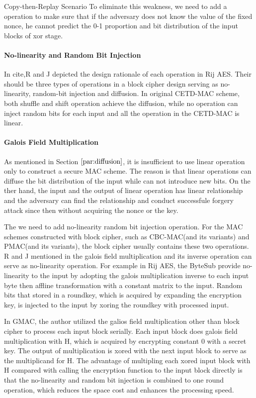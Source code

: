 Copy-then-Replay Scenario
To eliminate this weakness, we need to add a operation to make sure that if the adversary does not know the value of the fixed nonce, he cannot predict the 0-1 proportion and bit distribution of the input blocks of xor stage. 
\paragraph{No-linearity and Random Bit Injection}
In cite{},R and J depicted the design rationale of each operation in Rij AES. Their should be three types of operations in a block cipher design serving as no-linearity, random-bit injection and diffusion.  
In original CETD-MAC scheme, both shuffle and shift operation achieve the diffusion, while no operation can inject random bits for each input and all the operation in the CETD-MAC is linear.  

\paragraph{Galois Field Multiplication}
As mentioned in Section $\ref{par:diffusion}$, it is insufficient to use linear operation
only to construct a secure MAC scheme. The reason is that linear operations can
diffuse the bit distribution of the input while can not introduce new bits. On
the ther hand, the input and the output of linear operation has linear
relationship and the adversary can find the relationship and conduct successfule
forgery attack since then without acquiring the nonce or the key.

The we need to add no-linearity random bit injection operation. For the MAC
schemes constructed with block cipher, such as CBC-MAC(and its variants) and
PMAC(and its variants), the block cipher usually contains these two operations.
R and J mentioned in \cite{} the galois field multiplication and its inverse
operation can serve as no-linearity operation. 
For example in Rij AES, the ByteSub provide no-linearity to the input by
adopting the galois multiplication inverse to each input byte then affline
transformation with a constant matrix to the input. Random bits that stored in a
roundkey, which is acquired by expanding the encryption key, is injected to the
input by xoring the roundkey with processed input.  

In GMAC, the author utilized the galios field multiplication other than block
cipher to process each input block serially. Each input block does galois field
multiplication with H, which is acquired by encrypting constant 0 with a secret
key. The output of multiplication is xored with the next input block to serve as
the multiplicand for H. The advantage of multipling each xored input block with
H compared with calling the encryption function to the input block directly is
that the no-linearity and random bit injection is combined to one round
operation, which reduces the space cost and enhances the processing speed.

